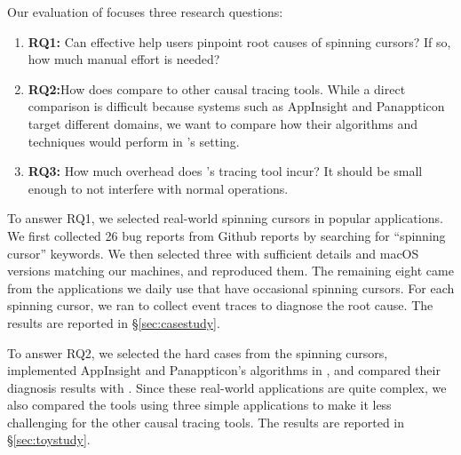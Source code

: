 

Our evaluation of \xxx focuses three research questions:

\begin{enumerate}

\item \textbf{RQ1:} Can \xxx effective help users pinpoint root causes of
  spinning cursors?  If so, how much manual effort is needed?

\item \textbf{RQ2:}How does \xxx compare to other causal tracing tools.
  While a direct comparison is difficult because systems such as
  AppInsight and Panappticon target different domains, we want to compare
  how their algorithms and techniques would perform in \xxx's setting.

\item \textbf{RQ3:} How much overhead does \xxx's tracing tool incur?  It
  should be small enough to not interfere with normal operations.

\end{enumerate}

To answer RQ1, we selected \nbug real-world spinning cursors in popular
applications.  We first collected 26 bug reports from Github reports by
searching for ``spinning cursor'' keywords.  We then selected three with
sufficient details and macOS versions matching our machines, and
reproduced them.  The remaining eight came from the applications we daily
use that have occasional spinning cursors.  For each spinning cursor, we
ran \xxx to collect event traces to diagnose the root cause.  The results
are reported in \S\ref{sec:casestudy}.

To answer RQ2, we selected the hard cases from the \nbug spinning cursors,
implemented AppInsight and Panappticon's algorithms in \xxx, and compared
their diagnosis results with \xxx.  Since these real-world applications
are quite complex, we also compared the tools using three simple
applications to make it less challenging for the other causal tracing
tools.  The results are reported in \S\ref{sec:toystudy}.


